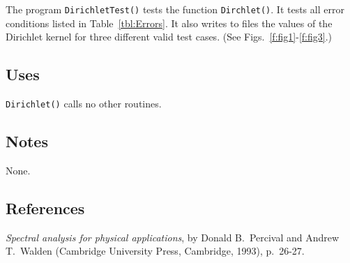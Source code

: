 \documentclass{article}
\begin{document}

The program {\tt DirichletTest()} tests the function {\tt Dirchlet()}.
It tests all error conditions listed in Table~\ref{tbl:Errors}.
It also writes to files the values of the Dirichlet kernel for three
different valid test cases.
(See Figs.~\ref{f:fig1}-\ref{f:fig3}.)

\subsection{Uses}


{\tt Dirichlet()\/} calls no other routines.

\subsection{Notes}

None.

\subsection{References}


\begin{thebibliography}{0}
{\em Spectral analysis for physical applications},
by Donald B.\ Percival and Andrew T.\ Walden
(Cambridge University Press, Cambridge, 1993), p.\ 26-27.
\end{thebibliography}

\end{document}
